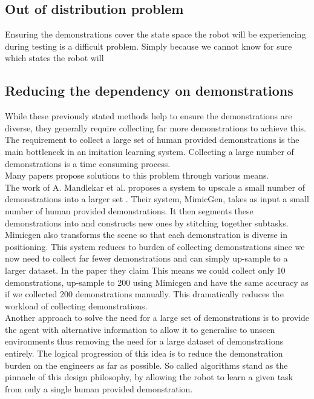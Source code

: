 \subsection{Out of distribution problem} %
Ensuring the demonstrations cover the state space the robot will be experiencing during testing is a difficult problem. Simply because we cannot know for sure which states the robot will 

\subsection{Reducing the dependency on demonstrations}
While these previously stated methods help to ensure the demonstrations are diverse, they generally require collecting far more demonstrations to achieve this. The requirement to collect a large set of human provided demonstrations is the main bottleneck in an imitation learning system. Collecting a large number of demonstrations is a time consuming process.\\
Many papers propose solutions to this problem through various means.\\

The work of A. Mandlekar et al. proposes a system to upscale a small number of demonstrations into a larger set \cite{mimicgen}. Their system, MimicGen, takes as input a small number of human provided demonstrations. It then segments these demonstrations into  and constructs new ones by stitching together subtasks. Mimicgen also transforms the scene so that each demonstration is diverse in positioning. This system reduces to burden of collecting demonstrations since we now need to collect far fewer demonstrations and can simply up-sample to a larger dataset. In the paper they claim  This means we could collect only 10 demonstrations, up-sample to 200 using Mimicgen and have the same accuracy as if we collected 200 demonstrations manually. This dramatically reduces the workload of collecting demonstrations.\\

Another approach to solve the need for a large set of demonstrations is to provide the agent with alternative information to allow it to generalise to unseen environments thus removing the need for a large dataset of demonstrations entirely. The logical progression of this idea is to reduce the demonstration burden on the engineers as far as possible. So called  algorithms stand as the pinnacle of this design philosophy, by allowing the robot to learn a given task from only a single human provided demonstration.\\


